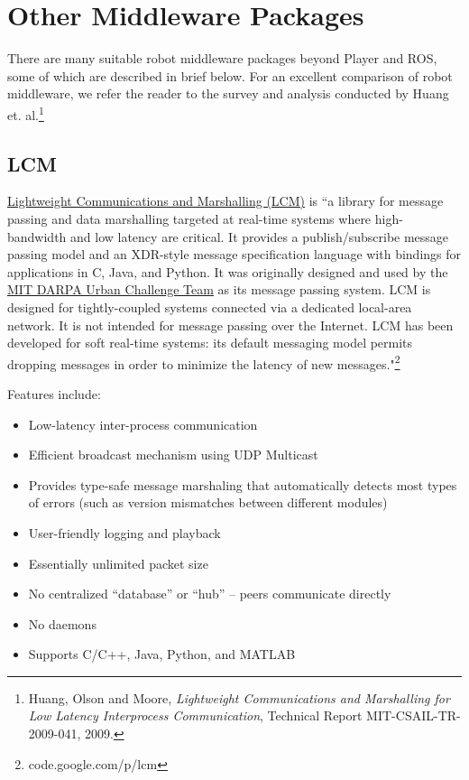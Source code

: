 \section{Other Middleware Packages}

There are many suitable robot middleware packages beyond Player and ROS, some of which are described in brief below.  For an excellent comparison of robot middleware, we refer the reader to the survey and analysis conducted by Huang et. al.\footnote{Huang, Olson and Moore, \textit{Lightweight Communications and Marshalling for Low Latency Interprocess Communication}, Technical Report MIT-CSAIL-TR-2009-041, 2009.}

\subsection{LCM}

\href{http://code.google.com/p/lcm/}{Lightweight Communications and Marshalling (LCM)} is ``a library for message passing and data marshalling targeted at real-time systems where high-bandwidth and low latency are critical. It provides a publish/subscribe message passing model and an XDR-style message specification language with bindings for applications in C, Java, and Python. It was originally designed and used by the \href{http://grandchallenge.mit.edu/}{MIT DARPA Urban Challenge Team} as its message passing system. LCM is designed for tightly-coupled systems connected via a dedicated local-area network. It is not intended for message passing over the Internet. LCM has been developed for soft real-time systems: its default messaging model permits dropping messages in order to minimize the latency of new messages."\footnote{code.google.com/p/lcm}

Features include:
\begin{itemize}
\item Low-latency inter-process communication
\item Efficient broadcast mechanism using UDP Multicast
\item Provides type-safe message marshaling that automatically detects most types of errors (such as version mismatches between different modules)
\item User-friendly logging and playback
\item Essentially unlimited packet size
\item No centralized ``database'' or ``hub'' -- peers communicate directly
\item No daemons
\item Supports C/C++, Java, Python, and MATLAB 
\end{itemize}

